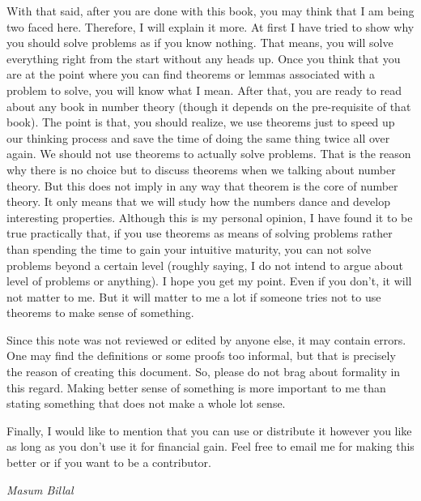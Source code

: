 \documentclass[a4paper, leqno]{article}
\theoremstyle{definition}
\theoremstyle{remark}
\begin{document}
		With that said, after you are done with this book, you may think that I am being two faced here. Therefore, I will explain it more. At first I have tried to show why you should solve problems as if you know nothing. That means, you will solve everything right from the start without any heads up. Once you think that you are at the point where you can find theorems or lemmas associated with a problem to solve, you will know what I mean. After that, you are ready to read about any book in number theory (though it depends on the pre-requisite of that book). The point is that, you should realize, we use theorems just to speed up our thinking process and save the time of doing the same thing twice all over again. We should not use theorems to actually solve problems. That is the reason why there is no choice but to discuss theorems when we talking about number theory. But this does not imply in any way that theorem is the core of number theory. It only means that we will study how the numbers dance and develop interesting properties. Although this is my personal opinion, I have found it to be true practically that, if you use theorems as means of solving problems rather than spending the time to gain your intuitive maturity, you can not solve problems beyond a certain level (roughly saying, I do not intend to argue about level of problems or anything). I hope you get my point. Even if you don't, it will not matter to me. But it will matter to me a lot if someone tries not to use theorems to make sense of something.
		
		Since this note was not reviewed or edited by anyone else, it may contain errors. One may find the definitions or some proofs too informal, but that is precisely the reason of creating this document. So, please do not brag about formality in this regard. Making better sense of something is more important to me than stating something that does not make a whole lot sense.
		
		Finally, I would like to mention that you can use or distribute it however you like as long as you don't use it for financial gain. Feel free to email me for making this better or if you want to be a contributor.
			\begin{flushright}
				\slshape Masum Billal\\
				\date{October $10$, $2016$}
			\end{flushright}
		\newpage
\end{document}
